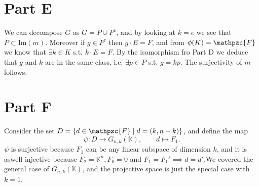 \documentclass[]{article}
\begin{document}
\section{Part E}
We can decompose $G$ as $G=P\cup P^c$, and by looking at $k=e$ we see that $P\subset \text{Im}(m)$. Moreover if $g\in P^c$ then $g\cdot E=F$, and from $\phi(K)=\mathpzc{F}$ we know that $\exists k \in K$ s.t. $ k\cdot E = F$. By the isomorphism fro Part D we deduce that $g$ and $k$ are in the same class, i.e. $\exists p\in P$ s.t. $g=kp$. The surjectivity of $m$ follows.

\section{Part F}
Consider the set $ D=\{d\in\mathpzc{F} \mid d=(k,n-k)\} $, and define the map $$ \psi:D\to G_{n,k}(\mathbb{K}), \qquad d\mapsto F_1. $$ $\psi$ is surjective because $F_1$ can be any linear subspace of dimension $k$, and it is aswell injective because $F_2 = \mathbb{K}^n, F_0 = {0} $ and $F_1=F_1' \implies d=d'$.We covered the general case of $G_{n,k}(\mathbb{K})$, and the projective space is just the special case with $k=1$. 
\end{document}
